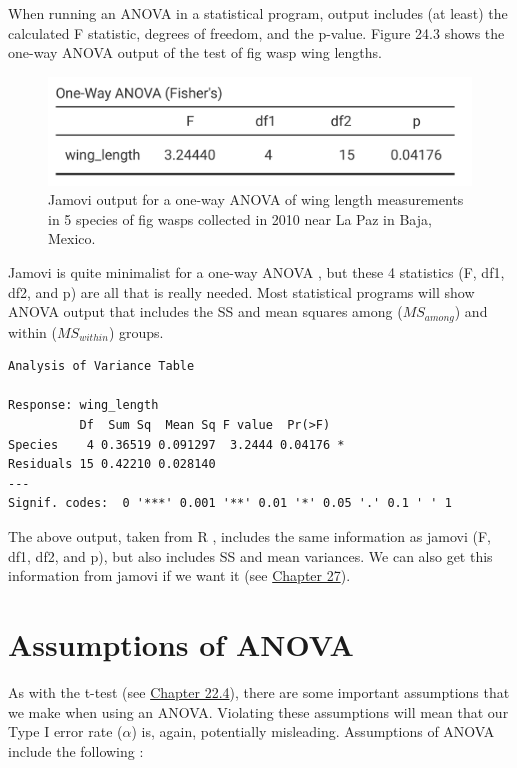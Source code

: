 \documentclass[
  openany]{scrbook}
\begin{document}
When running an ANOVA in a statistical program, output includes (at least) the calculated F statistic, degrees of freedom, and the p-value.
Figure 24.3 shows the one-way ANOVA output of the test of fig wasp wing lengths.

\begin{figure}
\includegraphics[width=0.6\linewidth]{img/jamovi_ANOVA_output} \caption{Jamovi output for a one-way ANOVA of wing length measurements in 5 species of fig wasps collected in 2010 near La Paz in Baja, Mexico.}\label{fig:unnamed-chunk-100}
\end{figure}

Jamovi is quite minimalist for a one-way ANOVA \citep{Jamovi2022}, but these 4 statistics (F, df1, df2, and p) are all that is really needed.
Most statistical programs will show ANOVA output that includes the SS and mean squares among (\(MS_{among}\)) and within (\(MS_{within}\)) groups.

\begin{verbatim}
Analysis of Variance Table

Response: wing_length
          Df  Sum Sq  Mean Sq F value  Pr(>F)  
Species    4 0.36519 0.091297  3.2444 0.04176 *
Residuals 15 0.42210 0.028140                  
---
Signif. codes:  0 '***' 0.001 '**' 0.01 '*' 0.05 '.' 0.1 ' ' 1
\end{verbatim}

The above output, taken from R \citep{Rproject}, includes the same information as jamovi (F, df1, df2, and p), but also includes SS and mean variances.
We can also get this information from jamovi if we want it (see \protect\hyperlink{Chapter_27}{Chapter 27}).

\hypertarget{assumptions-of-anova}{%
\section{Assumptions of ANOVA}\label{assumptions-of-anova}}

As with the t-test (see \protect\hyperlink{assumptions-of-t-tests}{Chapter 22.4}), there are some important assumptions that we make when using an ANOVA.
Violating these assumptions will mean that our Type I error rate (\(\alpha\)) is, again, potentially misleading.
Assumptions of ANOVA include the following \citep{Box1978, Sokal1995}:
\end{document}
